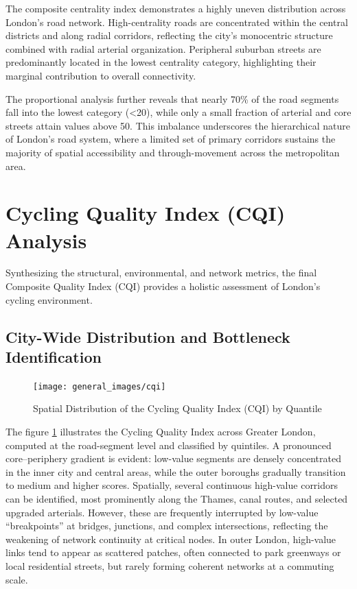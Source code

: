 \documentclass[
  12pt,
  oneside]{book}
\begin{document}
The composite centrality index demonstrates a highly uneven distribution across London's road network. High-centrality roads are concentrated within the central districts and along radial corridors, reflecting the city's monocentric structure combined with radial arterial organization. Peripheral suburban streets are predominantly located in the lowest centrality category, highlighting their marginal contribution to overall connectivity.

The proportional analysis further reveals that nearly 70\% of the road segments fall into the lowest category (\textless20), while only a small fraction of arterial and core streets attain values above 50. This imbalance underscores the hierarchical nature of London's road system, where a limited set of primary corridors sustains the majority of spatial accessibility and through-movement across the metropolitan area.

\section{Cycling Quality Index (CQI) Analysis}\label{cycling-quality-index-cqi-analysis}

Synthesizing the structural, environmental, and network metrics, the final Composite Quality Index (CQI) provides a holistic assessment of London's cycling environment.

\subsection{City-Wide Distribution and Bottleneck Identification}\label{city-wide-distribution-and-bottleneck-identification}

\begin{figure}

{\centering \texttt{[image: general\_images/cqi]} 

}

\caption{Spatial Distribution of the Cycling Quality Index (CQI) by Quantile}\label{fig:cqi}
\end{figure}

The figure \ref{fig:cqi} illustrates the Cycling Quality Index across Greater London, computed at the road-segment level and classified by quintiles. A pronounced core--periphery gradient is evident: low-value segments are densely concentrated in the inner city and central areas, while the outer boroughs gradually transition to medium and higher scores. Spatially, several continuous high-value corridors can be identified, most prominently along the Thames, canal routes, and selected upgraded arterials. However, these are frequently interrupted by low-value ``breakpoints'' at bridges, junctions, and complex intersections, reflecting the weakening of network continuity at critical nodes. In outer London, high-value links tend to appear as scattered patches, often connected to park greenways or local residential streets, but rarely forming coherent networks at a commuting scale.
\end{document}
